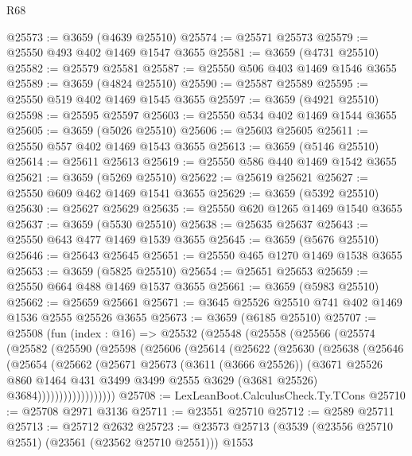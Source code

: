 \begin{lexlean}{R68}
\begin{coremodule}
@25573 := @3659 (@4639 @25510)
@25574 := @25571 @25573
@25579 := @25550 @493 @402 @1469 @1547 @3655
@25581 := @3659 (@4731 @25510)
@25582 := @25579 @25581
@25587 := @25550 @506 @403 @1469 @1546 @3655
@25589 := @3659 (@4824 @25510)
@25590 := @25587 @25589
@25595 := @25550 @519 @402 @1469 @1545 @3655
@25597 := @3659 (@4921 @25510)
@25598 := @25595 @25597
@25603 := @25550 @534 @402 @1469 @1544 @3655
@25605 := @3659 (@5026 @25510)
@25606 := @25603 @25605
@25611 := @25550 @557 @402 @1469 @1543 @3655
@25613 := @3659 (@5146 @25510)
@25614 := @25611 @25613
@25619 := @25550 @586 @440 @1469 @1542 @3655
@25621 := @3659 (@5269 @25510)
@25622 := @25619 @25621
@25627 := @25550 @609 @462 @1469 @1541 @3655
@25629 := @3659 (@5392 @25510)
@25630 := @25627 @25629
@25635 := @25550 @620 @1265 @1469 @1540 @3655
@25637 := @3659 (@5530 @25510)
@25638 := @25635 @25637
@25643 := @25550 @643 @477 @1469 @1539 @3655
@25645 := @3659 (@5676 @25510)
@25646 := @25643 @25645
@25651 := @25550 @465 @1270 @1469 @1538 @3655
@25653 := @3659 (@5825 @25510)
@25654 := @25651 @25653
@25659 := @25550 @664 @488 @1469 @1537 @3655
@25661 := @3659 (@5983 @25510)
@25662 := @25659 @25661
@25671 := @3645 @25526 @25510 @741 @402 @1469 @1536 @2555 @25526 @3655
@25673 := @3659 (@6185 @25510)
@25707 := @25508
    (fun (index : @16) =>
    @25532
      (@25548
        (@25558
          (@25566
            (@25574
              (@25582
                (@25590
                  (@25598
                    (@25606
                      (@25614
                        (@25622
                          (@25630
                            (@25638
                              (@25646
                                (@25654
                                  (@25662
                                    (@25671
                                      @25673
                                      (@3611 (@3666 @25526))
                                      (@3671
                                        @25526
                                        @860
                                        @1464
                                        @431
                                        @3499
                                        @3499
                                        @2555
                                        @3629
                                        (@3681 @25526)
                                        @3684))))))))))))))))))
@25708 := LexLeanBoot.CalculusCheck.Ty.TCons
@25710 := @25708 @2971 @3136
@25711 := @23551 @25710
@25712 := @2589 @25711
@25713 := @25712 @2632
@25723 := @23573 @25713 (@3539 (@23556 @25710 @2551) (@23561 (@23562 @25710 @2551))) @1553

\end{coremodule}
\end{lexlean}
